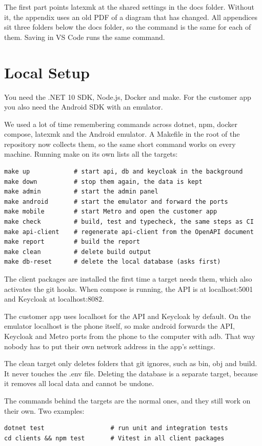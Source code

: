 \documentclass[a4paper,11pt]{article}
\begin{document}
The first part points latexmk at the shared settings in the docs folder. Without it, the appendix uses an old PDF of a diagram that has changed. All appendices sit three folders below the docs folder, so the command is the same for each of them. Saving in VS Code runs the same command.

\section{Local Setup}
You need the .NET 10 SDK, Node.js, Docker and make. For the customer app you also need the Android SDK with an emulator.

We used a lot of time remembering commands across dotnet, npm, docker compose, latexmk and the Android emulator. A Makefile in the root of the repository now collects them, so the same short command works on every machine. Running make on its own lists all the targets:

\begin{lstlisting}
make up            # start api, db and keycloak in the background
make down          # stop them again, the data is kept
make admin         # start the admin panel
make android       # start the emulator and forward the ports
make mobile        # start Metro and open the customer app
make check         # build, test and typecheck, the same steps as CI
make api-client    # regenerate api-client from the OpenAPI document
make report        # build the report
make clean         # delete build output
make db-reset      # delete the local database (asks first)
\end{lstlisting}

The client packages are installed the first time a target needs them, which also activates the git hooks. When compose is running, the API is at localhost:5001 and Keycloak at localhost:8082.

The customer app uses localhost for the API and Keycloak by default. On the emulator localhost is the phone itself, so make android forwards the API, Keycloak and Metro ports from the phone to the computer with adb. That way nobody has to put their own network address in the app's settings.

The clean target only deletes folders that git ignores, such as bin, obj and build. It never touches the .env file. Deleting the database is a separate target, because it removes all local data and cannot be undone.

The commands behind the targets are the normal ones, and they still work on their own. Two examples:
\begin{lstlisting}
dotnet test                  # run unit and integration tests
cd clients && npm test       # Vitest in all client packages
\end{lstlisting}
\end{document}
